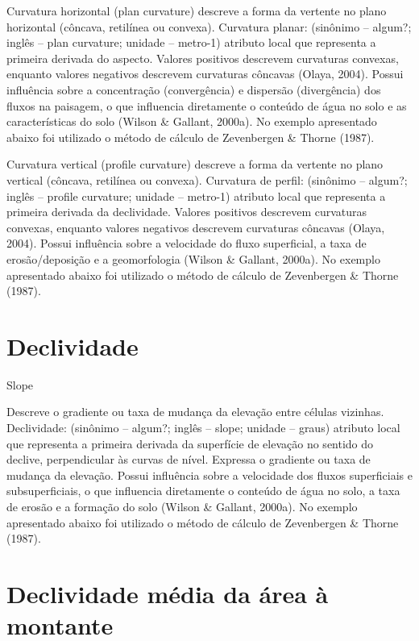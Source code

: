 \documentclass[]{book}
\begin{document}
Curvatura horizontal (plan curvature) descreve a forma da vertente no
plano horizontal (côncava, retilínea ou convexa). Curvatura planar:
(sinônimo -- algum?; inglês -- plan curvature; unidade -- metro-1)
atributo local que representa a primeira derivada do aspecto. Valores
positivos descrevem curvaturas convexas, enquanto valores negativos
descrevem curvaturas côncavas (Olaya, 2004). Possui influência sobre a
concentração (convergência) e dispersão (divergência) dos fluxos na
paisagem, o que influencia diretamente o conteúdo de água no solo e as
características do solo (Wilson \& Gallant, 2000a). No exemplo
apresentado abaixo foi utilizado o método de cálculo de Zevenbergen \&
Thorne (1987).

Curvatura vertical (proﬁle curvature) descreve a forma da vertente no
plano vertical (côncava, retilínea ou convexa). Curvatura de perfil:
(sinônimo -- algum?; inglês -- profile curvature; unidade -- metro-1)
atributo local que representa a primeira derivada da declividade.
Valores positivos descrevem curvaturas convexas, enquanto valores
negativos descrevem curvaturas côncavas (Olaya, 2004). Possui influência
sobre a velocidade do fluxo superficial, a taxa de erosão/deposição e a
geomorfologia (Wilson \& Gallant, 2000a). No exemplo apresentado abaixo
foi utilizado o método de cálculo de Zevenbergen \& Thorne (1987).

\section{Declividade}\label{declividade}

Slope

Descreve o gradiente ou taxa de mudança da elevação entre células
vizinhas. Declividade: (sinônimo -- algum?; inglês -- slope; unidade --
graus) atributo local que representa a primeira derivada da superfície
de elevação no sentido do declive, perpendicular às curvas de nível.
Expressa o gradiente ou taxa de mudança da elevação. Possui influência
sobre a velocidade dos fluxos superficiais e subsuperficiais, o que
influencia diretamente o conteúdo de água no solo, a taxa de erosão e a
formação do solo (Wilson \& Gallant, 2000a). No exemplo apresentado
abaixo foi utilizado o método de cálculo de Zevenbergen \& Thorne
(1987).

\section{Declividade média da área à
montante}\label{declividade-media-da-area-a-montante}
\end{document}

